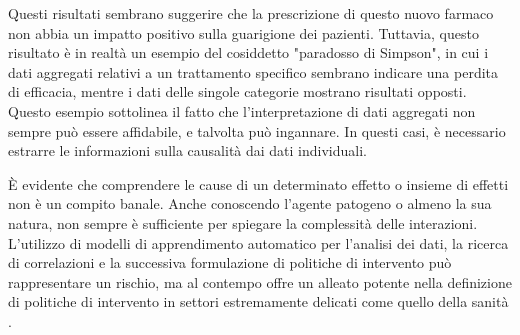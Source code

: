 Questi risultati sembrano suggerire che la prescrizione di questo 
nuovo farmaco non abbia un impatto positivo sulla guarigione dei 
pazienti. Tuttavia, questo risultato è in realtà un esempio del 
cosiddetto "paradosso di Simpson", in cui i dati aggregati relativi 
a un trattamento specifico sembrano indicare una perdita di efficacia, 
mentre i dati delle singole categorie mostrano risultati opposti. 
Questo esempio sottolinea il fatto che l'interpretazione di dati 
aggregati non sempre può essere affidabile, e talvolta può ingannare. 
In questi casi, è necessario estrarre le informazioni sulla causalità 
dai dati individuali.

È evidente che comprendere le cause di un determinato effetto o 
insieme di effetti non è un compito banale. Anche conoscendo 
l'agente patogeno o almeno la sua natura, non sempre è sufficiente 
per spiegare la complessità delle interazioni. 
L'utilizzo di modelli di apprendimento automatico per l'analisi dei 
dati, la ricerca di correlazioni e la successiva formulazione di 
politiche di intervento può rappresentare un rischio, ma al contempo 
offre un alleato potente nella definizione di politiche di intervento 
in settori estremamente delicati come quello della sanità 
\cite{doi:10.1098/rsos.220638}.